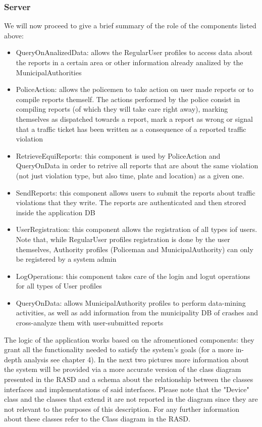 \subsubsection{Server}
We will now proceed to give a brief summary of the role of the components listed above:
\begin{itemize}
\item QueryOnAnalizedData: allows the RegularUser profiles to access data about the reports in a certain area or other information already analized by the MunicipalAuthorities
\item PoliceAction: allows the policemen to take action on user made reports or to compile reports themself. The actions performed by the police consist in compiling reports (of which they will take care right away), marking themselves as dispatched towards a report, mark a report as wrong or signal that a traffic ticket has been written as a consequence of a reported traffic violation
\item RetrieveEquiReports: this component is used by PoliceAction and QueryOnData in order to retrive all reports that are about the same violation (not just violation type, but also time, plate and location) as a given one. 
\item SendReports: this component allows users to submit the reports about traffic violations that they write. The reports are authenticated and then strored inside the application DB
\item UserRegistration: this component allows the registration of all types iof users. Note that, while RegularUser profiles registration is done by the user themselves, Authority profiles (Policeman and MunicipalAuthority) can only be registered by a system admin
\item LogOperations: this component takes care of the login and logut operations for all types of User profiles
\item QueryOnData: allows MunicipalAuthority profiles to perform data-mining activities,  as well as add information from the municipality DB of crashes and cross-analyze them with user-submitted reports
\end{itemize}
The logic of the application works based on the afromentioned components: they grant all the functionality needed to satisfy the system's goals (for a more in-depth analysis see chapter 4).
In the next two pictures more information about the system will be provided via a more accurate version of the class diagram presented in the RASD and a schema about the relationship between the classes interfaces and implementations of said interfaces. Please note that the "Device" class and the classes that extend it are not reported in the diagram since they are not relevant to the purposes of this description. For any further information about these classes refer to the Class diagram in the RASD.

